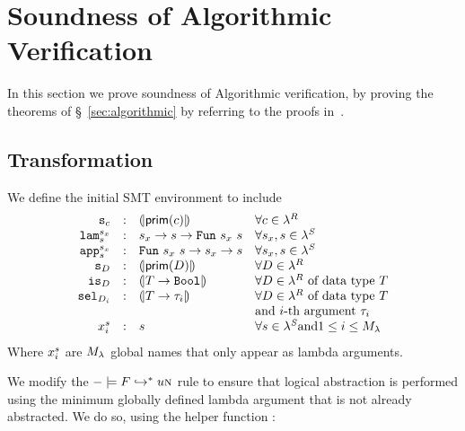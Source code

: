\section{Soundness of Algorithmic Verification}
%
In this section we prove soundness of Algorithmic verification, 
by proving the theorems of \S~\ref{sec:algorithmic}
by referring to the proofs in~\citep{Vazou14-tech}. 

\subsection{Transformation}

\begin{definition}\label{def:initialsmt}
 We define the initial SMT environment \smtenvinit to include
 $$
 \begin{array}{rcll}
 \smtvar{c}  &\colon &\embed{\constty{c}}
   &\forall c\in \corelan\\
 \smtlamname{\sort_x}{\sort}&\colon&\sort_x \rightarrow \sort\rightarrow\tsmtfun{\sort_x}{\sort}
   &\forall \sort_x, \sort\in \smtlan\\
 \smtappname{\sort_x}{\sort}&\colon&\tsmtfun{\sort_x}{\sort} \rightarrow \sort_x \rightarrow \sort
   &\forall \sort_x, \sort\in \smtlan\\
 \smtvar{\dc}&\colon&\embed{\constty{\dc}}
   &\forall\dc\in\corelan\\
 \checkdc{\dc}&\colon&\embed{T \rightarrow \tbool}
   &\forall \dc\in \corelan\ \text{of data type}\ T \\
 \selector{\dc}{i}&\colon&\embed{T \rightarrow \typ_i}
   &\forall \dc\in \corelan\ \text{of data type}\ T \\
   &&&\text{and}\ i\text{-th argument}\ \typ_i \\
 {x^{\sort}_i} & \colon&{\sort}& \forall \sort \in \smtlan \text{and} 1\leq i\leq \maxlamarg\\
 \end{array}
 $$
Where $x^{s}_i$ are $ {M_\lambda} $ global names that only appear as lambda arguments.
\end{definition}


We modify the $\textsc{\ensuremath{- \models {F}\hookrightarrow^{*}{u}}n}$ rule to ensure that 
logical abstraction is performed 
using the minimum globally defined lambda argument that is not already abstracted. 
We do so, using the helper function \maxlam{\sort}{\pred}:

